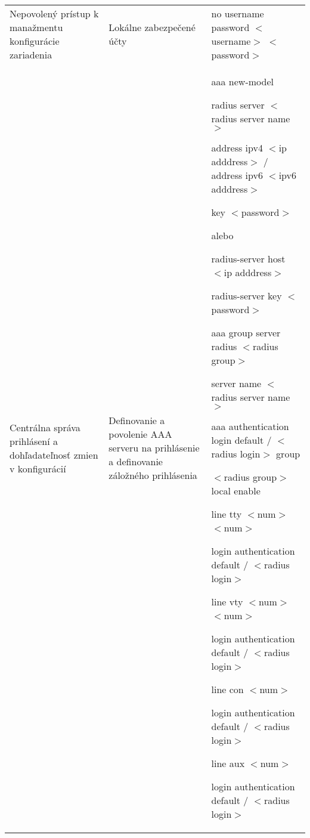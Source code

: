 \begin{longtable}[!htbp]{|L{10em}L{10em}>{\selectfont}L{34em}|}
	
	
	 Nepovolený prístup k manažmentu konfigurácie zariadenia	&Lokálne zabezpečené účty	&no username password  $<$username$>$ $<$password$>$\\
	
	
	
	Centrálna správa prihlásení a dohľadateľnosť zmien v konfigurácií	&Definovanie a povolenie AAA serveru na prihlásenie a definovanie záložného prihlásenia	&aaa new-model
	
	radius server $<$radius server name$>$
	
	\hspace{0.5em}address ipv4 $<$ip adddress$>$ / address ipv6 $<$ipv6 adddress$>$
	
	\hspace{0.5em}key $<$password$>$
	\vspace{0.5em}
	
	{\selectfont alebo}
	
	\vspace{0.5em}
	radius-server host $<$ip adddress$>$
	
	radius-server key $<$password$>$
	
	\vspace{0.5em}
	
	aaa group server radius $<$radius group$>$
	
	\hspace{0.5em}server name $<$radius server name$>$
	
	aaa authentication login default / $<$radius login$>$ group 
	
	\hspace{0.5em}$<$radius group$>$ local enable
	
	line tty $<$num$>$ $<$num$>$
	
	\hspace{0.5em}login authentication default / $<$radius login$>$
	
	line vty $<$num$>$ $<$num$>$
	
	\hspace{0.5em}login authentication default / $<$radius login$>$
	
	line con $<$num$>$
	
	\hspace{0.5em}login authentication default / $<$radius login$>$
	
	line aux $<$num$>$
	
	
	\hspace{0.5em}login authentication default / $<$radius login$>$\\
	

\end{longtable}
